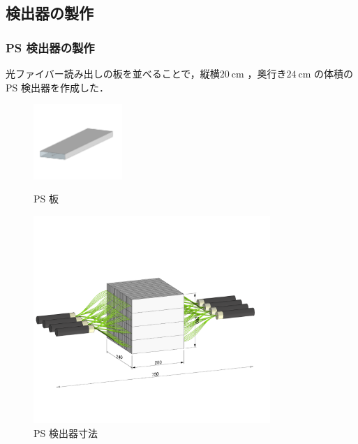 \subsection{検出器の製作}

\subsubsection{PS 検出器の製作}
光ファイバー読み出しの板を並べることで，縦横$20~\mathrm{cm}$ ，奥行き$24~\mathrm{cm}$ の体積のPS 検出器を作成した．

\begin{figure}[H]
\centering
\includegraphics[width=0.3\textwidth]{figure/hayakawa/psmd.png}
\caption{PS 板}
\includegraphics[width=0.8\textwidth]{figure/hayakawa/p7.png}
\caption{PS 検出器寸法}
\label{PS_sunpou}
\end{figure}

